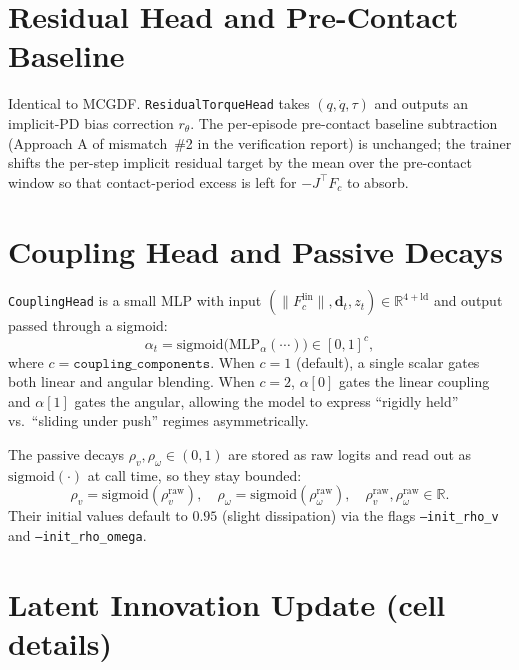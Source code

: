 \documentclass[11pt]{article}
\begin{document}
\section{Residual Head and Pre-Contact Baseline}

Identical to MCGDF.  \texttt{ResidualTorqueHead} takes $(q,\dot q,
\tau)$ and outputs an implicit-PD bias correction $r_\theta$.  The
per-episode pre-contact baseline subtraction (Approach A of
mismatch~\#2 in the verification report) is unchanged; the trainer
shifts the per-step implicit residual target by the mean over the
pre-contact window so that contact-period excess is left for
$-J^\top F_c$ to absorb.

\section{Coupling Head and Passive Decays}
\label{sec:coupling-head}

\texttt{CouplingHead} is a small MLP with input
$(\|F_c^{\mathrm{lin}}\|, \mathbf{d}_t, z_t) \in \mathbb{R}^{4+\mathrm{ld}}$
and output passed through a sigmoid:
\begin{equation}
  \alpha_t = \mathrm{sigmoid}\bigl(\mathrm{MLP}_\alpha(\cdots)\bigr) \in [0,1]^{c},
\end{equation}
where $c = \texttt{coupling\_components}$.  When $c=1$ (default), a
single scalar gates both linear and angular blending.  When $c=2$,
$\alpha[0]$ gates the linear coupling and $\alpha[1]$ gates the
angular, allowing the model to express ``rigidly held'' vs.\
``sliding under push'' regimes asymmetrically.

The passive decays $\rho_v, \rho_\omega \in (0,1)$ are stored as raw
logits and read out as $\mathrm{sigmoid}(\cdot)$ at call time, so
they stay bounded:
\begin{equation}
  \rho_v = \mathrm{sigmoid}(\rho_v^{\mathrm{raw}}),
  \quad
  \rho_\omega = \mathrm{sigmoid}(\rho_\omega^{\mathrm{raw}}),
  \quad
  \rho_v^{\mathrm{raw}}, \rho_\omega^{\mathrm{raw}} \in \mathbb{R}.
\end{equation}
Their initial values default to $0.95$ (slight dissipation) via the
flags \texttt{--init\_rho\_v} and \texttt{--init\_rho\_omega}.

\section{Latent Innovation Update (cell details)}
\end{document}
